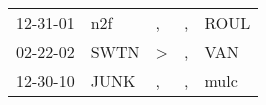 \begin{supertabular}{lllll}
 12-31-01 &   n2f &             , &  , &  ROUL \\
 02-22-02 &  SWTN &  \textgreater &  , &   VAN \\
 12-30-10 &  JUNK &             , &  , &  mulc \\
\end{supertabular}
